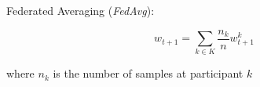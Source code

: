 
Federated Averaging (\textit{FedAvg}):

\begin{equation}
w_{t+1} = \sum_{k \in K} \frac{n_k}{n} w_{t+1}^k
\end{equation} \label{eq:fedavg}

where $n_k$ is the number of samples at participant $k$




    
    

